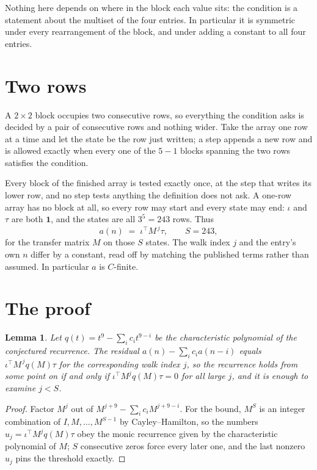 \documentclass[11pt,a4paper]{article}
\theoremstyle{plain}
\newtheorem{lemma}[theorem]{Lemma}
\theoremstyle{definition}
\begin{document}
Nothing here depends on where in the block each value sits: the condition is a statement about
the multiset of the four entries. In particular it is symmetric under every rearrangement of
the block, and under adding a constant to all four entries.

\section{Two rows}

A $2\times2$ block occupies two consecutive rows, so everything the condition asks is decided
by a pair of consecutive rows and nothing wider. Take the array one row at a time and let the
state be the row just written; a step appends a new row and is allowed exactly when every one
of the $5-1$ blocks spanning the two rows satisfies the condition.

Every block of the finished array is tested exactly once, at the step that writes its lower
row, and no step tests anything the definition does not ask. A one-row array has no block at
all, so every row may start and every state may end: $\iota$ and $\tau$ are both
$\mathbf{1}$, and the states are all $3^{5}=243$ rows. Thus
\[
a(n)\;=\;\iota^{\!\top}M^{\,j}\tau ,\qquad S=243,
\]
for the transfer matrix $M$ on those $S$ states. The walk index $j$ and the entry's own $n$
differ by a constant, read off by matching the published terms rather than assumed. In
particular $a$ is $C$-finite.

\section{The proof}

\begin{lemma}\label{lem:crit}
Let $q(t)=t^{9}-\sum_i c_it^{9-i}$ be the characteristic polynomial of the
conjectured recurrence. The residual $a(n)-\sum_ic_ia(n-i)$ equals
$\iota^{\!\top}M^{\,j}q(M)\tau$ for the corresponding walk index $j$, so the recurrence
holds from some point on if and only if $\iota^{\!\top}M^{j}q(M)\tau=0$ for all large $j$,
and it is enough to examine $j<S$.
\end{lemma}

\begin{proof}
Factor $M^{j}$ out of $M^{j+9}-\sum_ic_iM^{j+9-i}$. For the bound, $M^{S}$
is an integer combination of $I,M,\dots,M^{S-1}$ by Cayley--Hamilton, so the numbers
$u_j=\iota^{\!\top}M^{j}q(M)\tau$ obey the monic recurrence given by the characteristic
polynomial of $M$; $S$ consecutive zeros force every later one, and the last nonzero $u_j$
pins the threshold exactly.
\end{proof}
\end{document}
